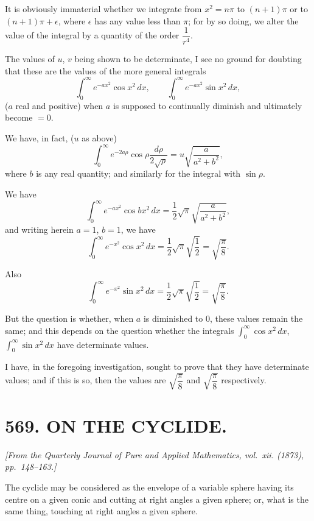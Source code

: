 \documentclass[11pt,a4paper]{article}
\theoremstyle{plain}
\theoremstyle{definition}
\theoremstyle{remark}
\newcommand{\paper}[2]{\section*{#1 #2}}
\newcommand{\papersource}[1]{\par\noindent\textit{#1}\par\medskip}
\begin{document}
It is obviously immaterial whether we integrate from $x^2 = n\pi$ to $(n+1)\pi$ or to $(n+1)\pi + \epsilon$, where $\epsilon$ has any value less than $\pi$; for by so doing, we alter the value of the integral by a quantity of the order $\dfrac{1}{r^4}$.

The values of $u$, $v$ being shown to be determinate, I see no ground for doubting that these are the values of the more general integrals
\[
\int_0^{\infty} e^{-ax^2} \cos x^2\,dx, \qquad \int_0^{\infty} e^{-ax^2} \sin x^2\,dx,
\]
($a$ real and positive) when $a$ is supposed to continually diminish and ultimately become $=0$.

We have, in fact, ($u$ as above)
\[
\int_0^{\infty} e^{-2a\rho} \cos \rho \frac{d\rho}{2\sqrt{\rho}} = u \sqrt{\frac{a}{a^2 + b^2}},
\]
where $b$ is any real quantity; and similarly for the integral with $\sin \rho$.

\newpage

We have
\[
\int_0^{\infty} e^{-ax^2} \cos bx^2\,dx = \frac{1}{2} \sqrt{\pi} \sqrt{\frac{a}{a^2 + b^2}},
\]
and writing herein $a = 1$, $b = 1$, we have
\[
\int_0^{\infty} e^{-x^2} \cos x^2\,dx = \frac{1}{2} \sqrt{\pi} \sqrt{\frac{1}{2}} = \sqrt{\frac{\pi}{8}}.
\]

Also
\[
\int_0^{\infty} e^{-x^2} \sin x^2\,dx = \frac{1}{2} \sqrt{\pi} \sqrt{\frac{1}{2}} = \sqrt{\frac{\pi}{8}}.
\]

But the question is whether, when $a$ is diminished to $0$, these values remain the same; and this depends on the question whether the integrals $\displaystyle\int_0^{\infty} \cos x^2\,dx$, $\displaystyle\int_0^{\infty} \sin x^2\,dx$ have determinate values.

I have, in the foregoing investigation, sought to prove that they have determinate values; and if this is so, then the values are $\sqrt{\dfrac{\pi}{8}}$ and $\sqrt{\dfrac{\pi}{8}}$ respectively.

\newpage
\paper{569.}{ON THE CYCLIDE.}

\papersource{[From the Quarterly Journal of Pure and Applied Mathematics, vol.~xii. (1873), pp.~148--163.]}

The cyclide may be considered as the envelope of a variable sphere having its centre on a given conic and cutting at right angles a given sphere; or, what is the same thing, touching at right angles a given sphere.
\end{document}
